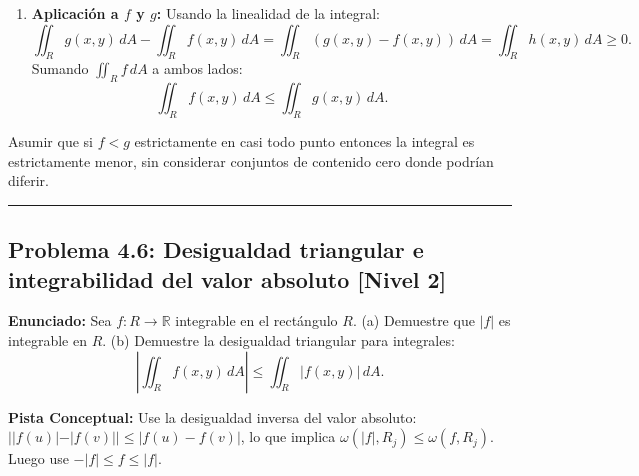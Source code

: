 \documentclass[11pt,a4paper]{article}
\begin{document}
\begin{enumerate}[label=\textbf{\arabic*.}]
\item \textbf{Aplicación a $f$ y $g$:}
Usando la linealidad de la integral:
\begin{equation*}
\iint_R g(x,y) \, dA - \iint_R f(x,y) \, dA = \iint_R (g(x,y) - f(x,y)) \, dA = \iint_R h(x,y) \, dA \ge 0.
\end{equation*}
Sumando $\iint_R f \, dA$ a ambos lados:
\begin{equation*}
\iint_R f(x,y) \, dA \le \iint_R g(x,y) \, dA.
\end{equation*}
\end{enumerate}

\begin{trapbox}
Asumir que si $f < g$ estrictamente en casi todo punto entonces la integral es estrictamente menor, sin considerar conjuntos de contenido cero donde podrían diferir.
\end{trapbox}

\vspace{0.5cm}
\hrule
\vspace{0.5cm}

\subsection*{Problema 4.6: Desigualdad triangular e integrabilidad del valor absoluto \hfill \color{primaryblue}\small[Nivel 2]}

\begin{tcolorbox}[colback=white,colframe=gray!40,arc=1mm,boxrule=0.5pt,left=3mm,right=3mm,top=2mm,bottom=2mm]
\textbf{Enunciado:} Sea $f: R \to \mathbb{R}$ integrable en el rectángulo $R$. (a) Demuestre que $|f|$ es integrable en $R$. (b) Demuestre la desigualdad triangular para integrales:
\begin{equation*}
\left| \iint_R f(x,y) \, dA \right| \le \iint_R |f(x,y)| \, dA.
\end{equation*}
\end{tcolorbox}

\begin{tcolorbox}[colback=yellow!4,colframe=accentamber!70,arc=1mm,boxrule=0.5pt,left=3mm,right=3mm,top=1.5mm,bottom=1.5mm]
\textbf{Pista Conceptual:} Use la desigualdad inversa del valor absoluto: $||f(u)| - |f(v)|| \le |f(u) - f(v)|$, lo que implica $\omega(|f|, R_j) \le \omega(f, R_j)$. Luego use $-|f| \le f \le |f|$.
\end{tcolorbox}
\end{document}
